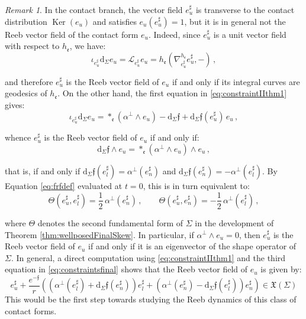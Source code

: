 \documentclass[10pt,reqno,a4paper]{amsart}
\theoremstyle{plain}
\theoremstyle{definition}
\theoremstyle{remark}
\newtheorem{remark}[thm]{Remark}
\theoremstyle{remark}
\def\dd{\mathrm{d}}
\def\cL{\mathcal{L}}
\def\cL{\mathcal{L}}
\def\fre{\mathfrak{e}}
\newcommand{\Ker}{\operatorname{Ker}}
\renewcommand{\(}{ (}
\renewcommand{\)}{ )}
\newcommand{\frf}{\mathfrak{f}}
\begin{document}
 \begin{remark}
\label{remark:Reebcontactbranch}
In the contact branch, the vector field $e^{\sharp}_u$ is transverse to the contact distribution $\Ker(e_u)$ and satisfies $e_u(e^{\sharp}_u) = 1$, but it is in general not the Reeb vector field of the contact form $e_u$. Indeed, since $e^{\sharp}_u$ is a unit vector field with respect to $h_{\fre}$, we have:
\begin{equation*}
\iota_{e^{\sharp}_u}\dd_{\Sigma} e_u = \cL_{e^{\sharp}_u} e_u = h_{\fre}(\nabla^{h_{\fre}}_{e^{\sharp}_u} e^{\sharp}_u , -)\, ,
\end{equation*}

\noindent
and therefore $e^{\sharp}_u$ is the Reeb vector field of $e_u$ if and only if its integral curves are geodesics of $h_{\fre}$. On the other hand, the first equation in \eqref{eq:constraintIIthm1} gives:
\begin{equation*}
\iota_{e^{\sharp}_u}\dd_{\Sigma} e_u = \ast_{\fre}(\alpha^{\perp}\wedge e_u) - \dd_{\Sigma}\frf + \dd_{\Sigma}\frf(e^{\sharp}_u)\, e_u\, ,
\end{equation*}

\noindent
whence $e^{\sharp}_u$ is the Reeb vector field of $e_u$ if and only if:
\begin{equation*}
\dd_{\Sigma}\frf\wedge e_u = \ast_{\fre}(\alpha^{\perp}\wedge e_u)\wedge e_u\, ,
\end{equation*}

\noindent
that is, if and only if $\dd_{\Sigma}\frf(e^{\sharp}_l) = \alpha^{\perp}(e^{\sharp}_n)$ and $\dd_{\Sigma}\frf(e^{\sharp}_n) = -\alpha^{\perp}(e^{\sharp}_l)$. By Equation \eqref{eq:frfdef} evaluated at $t=0$, this is in turn equivalent to:
\begin{equation*}
\Theta(e^{\sharp}_u , e^{\sharp}_l) = \frac{1}{2}\,\alpha^{\perp}(e^{\sharp}_n)\, , \qquad \Theta(e^{\sharp}_u , e^{\sharp}_n) = -\frac{1}{2}\,\alpha^{\perp}(e^{\sharp}_l)\, ,
\end{equation*}

\noindent
where $\Theta$ denotes the second fundamental form of $\Sigma$ in the development of Theorem \ref{thm:wellposedFinalSkew}. In particular, if $\alpha^{\perp}\wedge e_u = 0$, then $e^{\sharp}_u$ is the Reeb vector field of $e_u$ if and only if it is an eigenvector of the shape operator of $\Sigma$. In general, a direct computation using \eqref{eq:constraintIIthm1} and the third equation in \eqref{eq:constraintsfinal} shows that the Reeb vector field of $e_u$ is given by:
\begin{equation*} 
e^{\sharp}_u + \frac{e^{-\frf}}{r} (  (\alpha^{\perp}(e^{\sharp}_l) + \dd_{\Sigma}\frf(e^{\sharp}_n) ) e^{\sharp}_l +  (\alpha^{\perp}(e^{\sharp}_n) - \dd_{\Sigma}\frf(e^{\sharp}_l) ) e^{\sharp}_n ) \in \mathfrak{X}(\Sigma)
\end{equation*}
This would be the first step towards studying the Reeb dynamics of this class of contact forms.
\end{remark}
\end{document}
